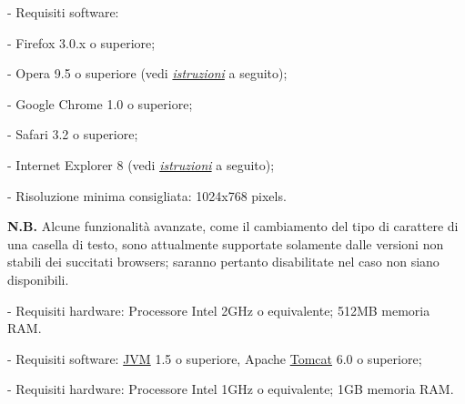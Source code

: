\begin{elencopuntato}[\normindent]
    \item[-] Requisiti software: 
\begin{elencopuntato}[\normindent]
 \item[-]   Firefox 3.0.x o superiore;
 \item[-]   Opera 9.5 o superiore (vedi \hyperlink{Opera}{\textit{istruzioni}} a seguito);
 \item[-]   Google Chrome 1.0 o superiore; 
 \item[-]   Safari 3.2 o superiore; 
 \item[-]   Internet Explorer 8 (vedi \hyperlink{IEx}{\textit{istruzioni}} a seguito);
 \item[-]   Risoluzione minima consigliata: 1024x768 pixels.
\end{elencopuntato}
\textbf{N.B.} Alcune funzionalit\`a avanzate, come il cambiamento del tipo di carattere di una casella di testo, sono attualmente supportate solamente dalle versioni non stabili dei succitati browsers; saranno pertanto disabilitate nel caso non siano disponibili.
    \item[-] Requisiti hardware: Processore Intel 2GHz o equivalente; 512MB memoria RAM.

\end{elencopuntato}
\begin{elencopuntato}[\normindent]
    \item[-] Requisiti software: \underline{JVM} 1.5 o superiore, Apache \underline{Tomcat} 6.0 o superiore;
    \item[-] Requisiti hardware: Processore Intel 1GHz o equivalente; 1GB memoria RAM.
\end{elencopuntato}
 \newpage
{}
 
